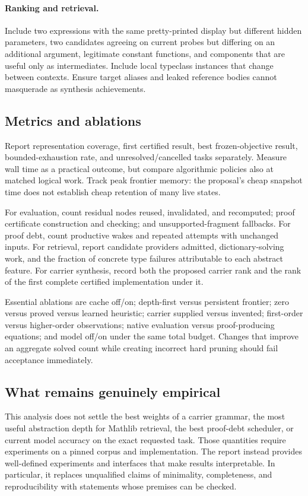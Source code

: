 \documentclass[11pt,a4paper]{article}
\theoremstyle{definition}
\theoremstyle{remark}
\begin{document}
\paragraph{Ranking and retrieval.}
Include two expressions with the same pretty-printed display but different
hidden parameters, two candidates agreeing on current probes but differing
on an additional argument, legitimate constant functions, and components that
are useful only as intermediates. Include local typeclass instances that
change between contexts. Ensure target aliases and leaked reference bodies
cannot masquerade as synthesis achievements.

\subsection{Metrics and ablations}
Report representation coverage, first certified result, best frozen-objective
result, bounded-exhaustion rate, and unresolved/cancelled tasks separately.
Measure wall time as a practical outcome, but compare algorithmic policies
also at matched logical work. Track peak frontier memory: the proposal's cheap
snapshot time does not establish cheap retention of many live states.

For evaluation, count residual nodes reused, invalidated, and recomputed;
proof certificate construction and checking; and unsupported-fragment fallbacks.
For proof debt, count productive wakes and repeated attempts with unchanged
inputs. For retrieval, report candidate providers admitted, dictionary-solving
work, and the fraction of concrete type failures attributable to each abstract
feature. For carrier synthesis, record both the proposed carrier rank and the
rank of the first complete certified implementation under it.

Essential ablations are cache off/on; depth-first versus persistent frontier;
zero versus proved versus learned heuristic; carrier supplied versus invented;
first-order versus higher-order observations; native evaluation versus
proof-producing equations; and model off/on under the same total budget.
Changes that improve an aggregate solved count while creating incorrect hard
pruning should fail acceptance immediately.

\subsection{What remains genuinely empirical}
This analysis does not settle the best weights of a carrier grammar, the
most useful abstraction depth for Mathlib retrieval, the best proof-debt
scheduler, or current model accuracy on the exact requested task. Those
quantities require experiments on a pinned corpus and implementation. The
report instead provides well-defined experiments and interfaces that make
results interpretable. In particular, it replaces unqualified claims of
minimality, completeness, and reproducibility with statements whose premises
can be checked.
\end{document}
